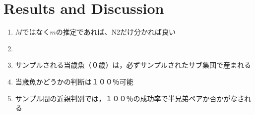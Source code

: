 \documentclass[AMA,STIX1COL]{WileyNJD-v2}
\begin{document}
\begin{comment}
今回新たに開発した移動に関する関係式について、以下の６種類の親魚に関するその子供（当歳魚）ペアがありえる：
\begin{enumerate}
  \item $N_1(t)\to N_2(t+1)$
  \item $N_1(t)\to N_2(t+2)$
  \item $N_1(t+1)\to N_2(t+2)$
  \item $N_2(t)\to N_1(t+1)$
  \item $N_2(t)\to N_1(t+2)$
  \item $N_2(t+1)\to N_1(t+2)$
\end{enumerate}
右向きの矢印$\to$は、興味ある親魚が年を跨いだ後どのサブ集団に属しているかを表している。１番目を例にとると、$t$年にサブ集団１から、$t+1$年にサブ集団２からそれぞれ当歳魚をサンプルすることを意味する。加えて、同じサブ集団から年を跨いで見つかる半兄弟ペアに基づく関係式についても、以下の６種類が考えられる：
\begin{enumerate}
\setcounter{enumi}{6}
  \item $N_1(t)\to N_1(t+1)$
  \item $N_1(t)\to N_1(t+2)$
  \item $N_1(t+1)\to N_1(t+2)$
  \item $N_2(t)\to N_2(t+1)$
  \item $N_2(t)\to N_2(t+2)$
  \item $N_2(t+1)\to N_2(t+2)$
\end{enumerate}
以上の、合計１２種類の式を連立できることを示した。最大１４個のパラメータが必要となるのであったが、パラメータ数を応用先に応じて適宜減少させることができる場合、興味あるパラメータを推定することができる。

ちなみに、同一年内に同じサブ集団内で見つかるMHSペアについては、有効集団サイズの情報（正確には有効繁殖サイズ、Effective breeding size）は持っているが、センサスサイズに関するダイレクトな情報は持っていない点に注意。
\end{comment}%

\section{Results and Discussion}\label{sec4}

\begin{enumerate}
  \item $M$ではなく$m$の推定であれば、N2だけ分かれば良い
  \item 
  \item サンプルされる当歳魚（０歳）は，必ずサンプルされたサブ集団で産まれる
  \item 当歳魚かどうかの判断は１００％可能
  \item サンプル間の近親判別では，１００％の成功率で半兄弟ペアか否かがなされる
\end{enumerate}
\end{document}
